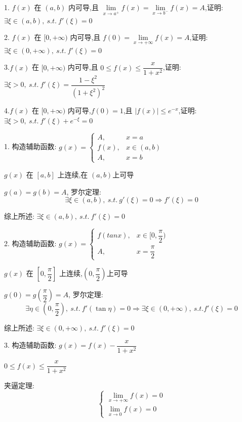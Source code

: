 \begin{proposition}
	1. $f(x)$ 在 $(a,b)$ 内可导,且 $\lim\limits_{x\to a^{+}}f(x)=\lim\limits_{x\to b^{-}}f(x)=A$,证明: $\exists \xi\in(a,b),\ s.t.\ f'(\xi)=0$

	2. $f(x)$ 在 $[0,+\infty)$ 内可导,且 $f(0)=\lim\limits_{x\to +\infty}f(x)=A$,证明: $\exists \xi\in(0,+\infty),\ s.t.\ f'(\xi)=0$

	3.$f(x)$ 在 $[0,+\infty)$ 内可导,且 $0\leq f(x)\leq \dfrac{x}{1+x^2}$,证明: $\exists \xi>0,\ s.t.\ f'(\xi)=\dfrac{1-\xi^2}{(1+\xi^2)^2}$

	4.$f(x)$ 在 $[0,+\infty)$ 内可导,$f(0)=1$,且 $|f(x)|\leq e^{-x}$,证明: $\exists \xi>0,\ s.t.\ f'(\xi)+e^{-\xi}=0$

\end{proposition}
\begin{solution}

	1. 构造辅助函数: $g(x) = \begin{cases}
		A, & x = a\\
		f(x),  & x\in(a,b) \\
		A, & x = b
	\end{cases}$

	$g(x)$ 在 $[a,b]$ 上连续,在 $(a,b)$上可导
	
	$g(a) = g(b) = A$, 罗尔定理:
	$$\exists\xi\in(a,b),\ s.t.\ g'(\xi)=0\Rightarrow f'(\xi)=0$$

	综上所述: $\exists \xi\in(a,b),\ s.t.\ f'(\xi)=0$


	2. 构造辅助函数: $g(x) = \begin{cases}
		f(tan x), & x\in[0,\dfrac{\pi}{2}) \\
		A, & x=\dfrac{\pi}{2}
	\end{cases} $

	$g(x)$ 在 $[0,\dfrac{\pi}{2}]$ 上连续,$(0,\dfrac{\pi}{2})$上可导
	
	$g(0)=g(\dfrac{\pi}{2})=A$, 罗尔定理:
	$$\exists\eta\in(0,\frac{\pi}{2}),\ s.t.\ f'(\tan \eta)=0\Rightarrow \exists \xi\in(0,+\infty),\ s.t. f'(\xi)=0$$

	综上所述: $\exists \xi\in(0,+\infty),\ s.t.\ f'(\xi)=0$


	3. 构造辅助函数: $g(x)=f(x)-\dfrac{x}{1+x^2}$

	$0\leq f(x)\leq \dfrac{x}{1+x^2}$
	
	夹逼定理:
	$$\begin{cases}
		\lim\limits_{x\to +\infty}f(x)=0 \\
		\lim\limits_{x\to 0}f(x)=0
	\end{cases}$$


\end{solution}
